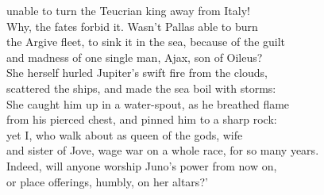 \documentclass[12pt, a5paper]{letter}
\begin{document}
unable to turn the Teucrian king away from Italy!\\
Why, the fates forbid it. Wasn't Pallas able to burn\\
the Argive fleet, to sink it in the sea, because of the guilt\\
and madness of one single man, Ajax, son of Oileus?\\
She herself hurled Jupiter's swift fire from the clouds,\\
scattered the ships, and made the sea boil with storms:\\
She caught him up in a water-spout, as he breathed flame\\
from his pierced chest, and pinned him to a sharp rock:\\
yet I, who walk about as queen of the gods, wife\\
and sister of Jove, wage war on a whole race, for so many years.\\
Indeed, will anyone worship Juno's power from now on,\\
or place offerings, humbly, on her altars?'
\end{document}
